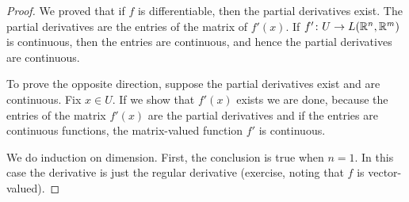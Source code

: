 \begin{proof}
We proved that if $f$ is differentiable, then
the partial derivatives exist.  The partial
derivatives are the entries of the matrix of $f'(x)$.  If
$f' \colon U \to L({\mathbb{R}}^n,{\mathbb{R}}^m)$ is continuous, then the entries are
continuous, and hence the partial derivatives are continuous.

To prove the opposite direction,
suppose the partial derivatives exist and are continuous.
Fix $x \in U$.  If we show that $f'(x)$ exists we are done, because
the entries of the matrix $f'(x)$ are the partial derivatives and if
the entries are continuous functions, the matrix-valued function $f'$ is
continuous.

We do induction on dimension.  First,
the conclusion is true when $n=1$.  In this case the derivative
is just the regular derivative (exercise, noting
that $f$ is vector-valued).


\end{proof}
